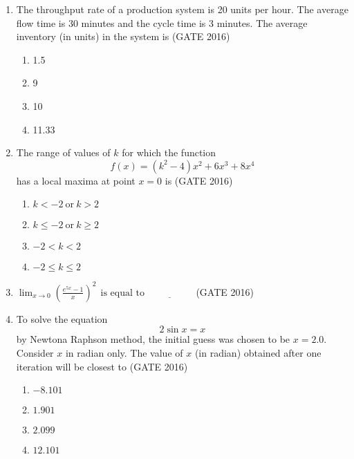 \documentclass[journal,12pt,onecolumn]{IEEEtran}
\theoremstyle{remark}
\begin{document}
\begin{enumerate}
\vspace{0.5cm}

\item The throughput rate of a production system is 20 units per hour. 
The average flow time is 30 minutes and the cycle time is 3 minutes. 
The average inventory (in units) in the system is  \hfill{(GATE 2016)}

\begin{multicols}{2}
\begin{enumerate}
    \item 1.5
    \item 9
    \item 10
    \item 11.33
\end{enumerate}
\end{multicols}

\vspace{0.5cm}

\item The range of values of $k$ for which the function  
\[
f(x) = (k^2 - 4)x^2 + 6x^3 + 8x^4
\]  
has a local maxima at point $x = 0$ is  \hfill{(GATE 2016)}

\begin{multicols}{2}
\begin{enumerate}
    \item $k < -2 \ \text{or} \ k > 2$
    \item $k \leq -2 \ \text{or} \ k \geq 2$
    \item $-2 < k < 2$
    \item $-2 \leq k \leq 2$
\end{enumerate}
\end{multicols}

\vspace{0.5cm}

\item 

$\lim_{x \to 0} \left(\frac{e^{5x} - 1}{x}\right)^2 \ \ \text{is equal to} \ \underline{\hspace{2cm}}$
\vspace{0.5cm} \hfill{(GATE 2016)}
\item To solve the equation  
\[
2 \sin x = x
\]  
by Newtona Raphson method, the initial guess was chosen to be $x = 2.0$. 
Consider $x$ in radian only. The value of $x$ (in radian) obtained after one iteration will be closest to  \hfill{(GATE 2016)}

\begin{multicols}{2}
\begin{enumerate}
    \item $-8.101$
    \item $1.901$
    \item $2.099$
    \item $12.101$
\end{enumerate}
\end{multicols}


\end{enumerate}
\end{document}
